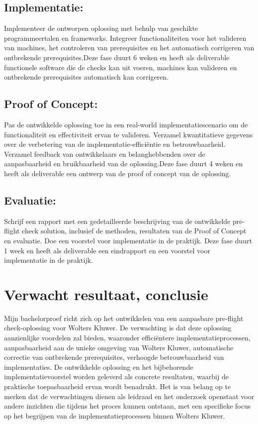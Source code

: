\subsection{Implementatie:}
Implementeer de ontworpen oplossing met behulp van geschikte programmeertalen en frameworks. Integreer functionaliteiten voor het valideren van machines, het controleren van prerequisites en het automatisch corrigeren van ontbrekende prerequisites.Deze fase duurt 6 weken en heeft als deliverable functionele software die de checks kan uit voeren, machines kan valideren en ontbrekende prerequisites automatisch kan corrigeren.

\subsection{Proof of Concept:}
Pas de ontwikkelde oplossing toe in een real-world implementatiescenario om de functionaliteit en effectiviteit ervan te valideren. Verzamel kwantitatieve gegevens over de verbetering van de implementatie-efficiëntie en betrouwbaarheid. Verzamel feedback van ontwikkelaars en belanghebbenden over de aanpasbaarheid en bruikbaarheid van de oplossing.Deze fase duurt 4 weken en heeft als deliverable een ontwerp van de proof of concept van de oplossing.

\subsection{Evaluatie:}
Schrijf een rapport met een gedetailleerde beschrijving van de ontwikkelde pre-flight check solution, inclusief de methoden, resultaten van de Proof of Concept en evaluatie. Doe een voorstel voor implementatie in de praktijk. Deze fase duurt 1 week en heeft als deliverable een eindrapport en een voorstel voor implementatie in de praktijk.


\section{Verwacht resultaat, conclusie}%
\label{sec:verwachte_resultaten}

Mijn bachelorproef richt zich op het ontwikkelen van een aanpasbare pre-flight check-oplossing voor Wolters Kluwer. De verwachting is dat deze oplossing aanzienlijke voordelen zal bieden, waaronder efficiëntere implementatieprocessen, aanpasbaarheid aan de unieke omgeving van Wolters Kluwer, automatische correctie van ontbrekende prerequisites, verhoogde betrouwbaarheid van implementaties. De ontwikkelde oplossing en het bijbehorende implementatievoorstel worden geleverd als concrete resultaten, waarbij de praktische toepasbaarheid ervan wordt benadrukt. Het is van belang op te merken dat de verwachtingen dienen als leidraad en het onderzoek openstaat voor andere inzichten die tijdens het proces kunnen ontstaan, met een specifieke focus op het begrijpen van de implementatieprocessen binnen Wolters Kluwer.


